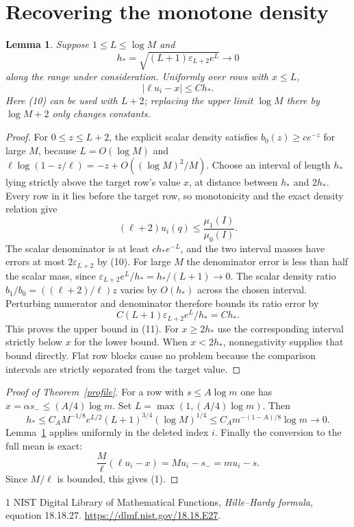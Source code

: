\documentclass[11pt]{article}
\newtheorem{lemma}{Lemma}
\begin{document}
\section*{Recovering the monotone density}
\begin{lemma}\label{ratio}
Suppose $1\le L\le\log M$ and
\[
 h_*=\sqrt{(L+1)\varepsilon_{L+2}e^L}\longrightarrow0
\]
along the range under consideration. Uniformly over rows with $x\le L$,
\[
 |\ell u_i-x|\le C h_* .                         \tag{11}
\]
Here (10) can be used with $L+2$; replacing the upper limit
$\log M$ there by $\log M+2$ only changes constants.
\end{lemma}
\begin{proof}
For $0\le z\le L+2$, the explicit scalar density satisfies
$b_0(z)\ge c e^{-z}$ for large $M$, because
$L=O(\log M)$ and
$\ell\log(1-z/\ell)=-z+O((\log M)^2/M)$.
Choose an interval of length $h_*$ lying strictly above the target
row's value $x$, at distance between $h_*$ and $2h_*$.
Every row in it lies before the target row, so monotonicity and the
exact density relation give
\[
 (\ell+2)u_i(q)\le\frac{\mu_1(I)}{\mu_0(I)}.
\]
The scalar denominator is at least $c h_*e^{-L}$, and the two
interval masses have errors at most $2\varepsilon_{L+2}$ by (10).
For large $M$ the denominator error is less than half the scalar
mass, since
$\varepsilon_{L+2}e^L/h_*=h_* /(L+1)\to0$.
The scalar density ratio $b_1/b_0=((\ell+2)/\ell)z$ varies by
$O(h_*)$ across the chosen interval. Perturbing numerator and
denominator therefore bounds its ratio error by
\[
 C(L+1)\varepsilon_{L+2}e^L/h_*=C h_*.
\]
This proves the upper bound in (11). For $x\ge2h_*$ use the
corresponding interval strictly below $x$ for the lower bound.
When $x<2h_*$, nonnegativity supplies that bound directly.
Flat row blocks cause no problem because the comparison intervals
are strictly separated from the target value.
\end{proof}

\begin{proof}[Proof of Theorem~\ref{profile}]
For a row with $s\le A\log m$ one has
$x=\alpha s_-\le(A/4)\log m$. Set
$L=\max(1,(A/4)\log m)$. Then
\[
 h_*\le C_A M^{-1/8}e^{L/2}(L+1)^{3/4}
                                      (\log M)^{1/4}
       \le C_A m^{-(1-A)/8}\log m\longrightarrow0.
\]
Lemma~\ref{ratio} applies uniformly in the deleted index $i$.
Finally the conversion to the full mean is exact:
\[
 \frac M\ell(\ell u_i-x)=M u_i-s_-=m u_i-s.
\]
Since $M/\ell$ is bounded, this gives (1).
\end{proof}

\begin{thebibliography}{1}
 NIST Digital Library of Mathematical Functions,
\emph{Hille--Hardy formula}, equation 18.18.27.
\url{https://dlmf.nist.gov/18.18.E27}.
\end{thebibliography}
\end{document}
